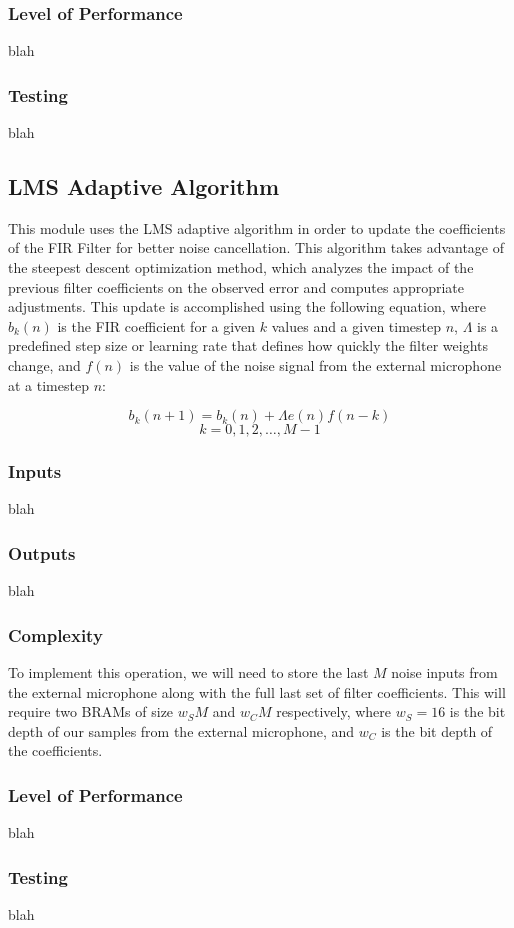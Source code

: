 \documentclass[12pt]{fpgairpods}
\begin{document}
\begin{multicols}{2}
\subsubsection{Level of Performance}
blah
\subsubsection{Testing}
blah

\subsection{LMS Adaptive Algorithm}
This module uses the LMS adaptive algorithm in order to update the coefficients of the FIR Filter for better noise cancellation. This algorithm takes advantage of the steepest descent optimization method, which analyzes the impact of the previous filter coefficients on the observed error and computes appropriate adjustments. This update is accomplished using the following equation, where $b_k(n)$ is the FIR coefficient for a given $k$ values and a given timestep $n$, $\Lambda$ is a predefined step size or learning rate that defines how quickly the filter weights change, and $f(n)$ is the value of the noise signal from the external microphone at a timestep $n$:

\[ b_k(n + 1) = b_k(n) + \Lambda e(n)f(n-k) \]
\[ k = 0, 1, 2,\ldots,  M-1 \]

\subsubsection{Inputs}
blah
\subsubsection{Outputs}
blah
\subsubsection{Complexity}
To implement this operation, we will need to store the last $M$ noise inputs from the external microphone along with the full last set of filter coefficients. This will require two BRAMs of size $w_S M$ and $w_C M$ respectively, where $w_S = 16$ is the bit depth of our samples from the external microphone, and $w_C$ is the bit depth of the coefficients.
\subsubsection{Level of Performance}
blah
\subsubsection{Testing}
blah


\end{multicols}
\end{document}
